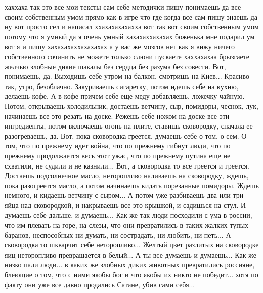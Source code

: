  
 
 
 
 

хаххаха так это все мои тексты сам себе методички пишу понимаешь да все своим
собственным умом прямо как в игре что где когда все сам пишу знаешь да ну вот
просто сел и написал ххахахахахахха вот так вот своим собственным умом потому
что я умный да я очень умный хахахаххахахах боженька мне подарил ум вот я и
пишу хахахахаххахахахах а у вас же мозгов нет как я вижу ничего собственного
сочинить не можете только слюни пускаете хаххахахаа брызгаете желчью злобные
дикие шакалы без сердца без разума без совести. Вот, понимаешь, да. Выходишь
себе утром на балкон, смотришь на Киев... Красиво так, утро, безоблачно.
Закуриваешь сигаретку, потом идешь себе на кухню, делаешь кофе. А в кофе причем
себе еще меду добавляешь, ложечку чайную. Потом, открываешь холодильник,
достаешь ветчину, сыр, помидоры, чеснок, лук, начинаешь все это резать на
доске. Режешь себе ножом на доске все эти ингредиенты, потом включаешь огонь на
плите, ставишь сковородку, сначала ее разогреваешь, да.  Вот, пока сковородка
греется, думаешь себе о том, о сем. О том, что по прежнему идет война, что по
прежнему гибнут люди, что по прежнему продолжается весь этот ужас, что по
прежнему путина еще не схватили, не судили и не казнили... Вот, а сковородка то
все греется и греется. Достаешь подсолнечное масло, неторопливо наливаешь на
сковородку, ждешь, пока разогреется масло, а потом начинаешь кидать порезанные
помидоры.  Ждешь немного, и кидаешь ветчину с сыром... А потом уже разбиваешь
два или три яйца над сковородкой, и накрываешь все это крышкой, и садишься на
стул. И думаешь себе дальше, и думаешь... Как же так люди посходили с ума в
россии, что им плевать на горе, на слезы, что они превратились в таких жалких
тупых баранов, неспособных ни думать, ни сострадать, ни любить, ни петь... А
сковородка то шкварчит себе неторопливо... Желтый цвет разлитых на сковородке
яиц неторопливо превращается в белый... А ты все думаешь и думаешь... Как же
низко пали люди... в каких же злобных диких животных превратились россияне,
блеющие о том, что с ними якобы бог и что якобы их никто не победит... хотя по
факту они уже все давно продались Сатане, убив сами себя...

